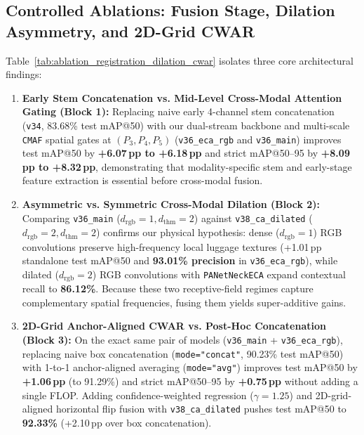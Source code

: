 \documentclass[journal,twoside,web]{ieeecolor}
\begin{document}
\subsection{Controlled Ablations: Fusion Stage, Dilation Asymmetry, and 2D-Grid CWAR}
Table~\ref{tab:ablation_registration_dilation_cwar} isolates three core architectural findings:
\begin{enumerate}
    \item \textbf{Early Stem Concatenation vs. Mid-Level Cross-Modal Attention Gating (Block 1):} Replacing naive early 4-channel stem concatenation (\texttt{v34}, 83.68\% test mAP@50) with our dual-stream backbone and multi-scale \texttt{CMAF} spatial gates at $(P_3, P_4, P_5)$ (\texttt{v36\_eca\_rgb} and \texttt{v36\_main}) improves test mAP@50 by \textbf{+6.07\,pp to +6.18\,pp} and strict mAP@50--95 by \textbf{+8.09\,pp to +8.32\,pp}, demonstrating that modality-specific stem and early-stage feature extraction is essential before cross-modal fusion.
    \item \textbf{Asymmetric vs. Symmetric Cross-Modal Dilation (Block 2):} Comparing \texttt{v36\_main} ($d_{\text{rgb}}=1, d_{\text{thm}}=2$) against \texttt{v38\_ca\_dilated} ($d_{\text{rgb}}=2, d_{\text{thm}}=2$) confirms our physical hypothesis: dense ($d_{\text{rgb}}=1$) RGB convolutions preserve high-frequency local luggage textures (+1.01\,pp standalone test mAP@50 and \textbf{93.01\% precision} in \texttt{v36\_eca\_rgb}), while dilated ($d_{\text{rgb}}=2$) RGB convolutions with \texttt{PANetNeckECA} expand contextual recall to \textbf{86.12\%}. Because these two receptive-field regimes capture complementary spatial frequencies, fusing them yields super-additive gains.
    \item \textbf{2D-Grid Anchor-Aligned CWAR vs. Post-Hoc Concatenation (Block 3):} On the exact same pair of models (\texttt{v36\_main} + \texttt{v36\_eca\_rgb}), replacing naive box concatenation (\texttt{mode="concat"}, 90.23\% test mAP@50) with 1-to-1 anchor-aligned averaging (\texttt{mode="avg"}) improves test mAP@50 by \textbf{+1.06\,pp} (to 91.29\%) and strict mAP@50--95 by \textbf{+0.75\,pp} without adding a single FLOP. Adding confidence-weighted regression ($\gamma=1.25$) and 2D-grid-aligned horizontal flip fusion with \texttt{v38\_ca\_dilated} pushes test mAP@50 to \textbf{92.33\%} (+2.10\,pp over box concatenation).
\end{enumerate}
\end{document}
